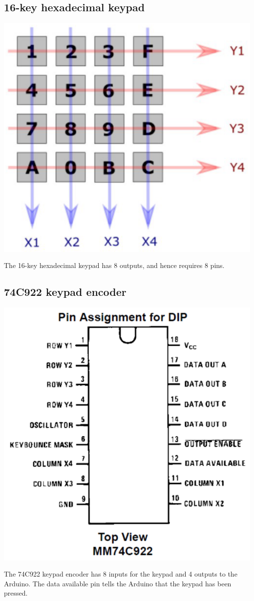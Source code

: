 \documentclass[11pt]{article}
\begin{document}
\subsection{16-key hexadecimal keypad}
\label{sec:orgb7012b9}
\begin{center}
\includegraphics[width=.9\linewidth]{./images/16-key-hexadecimal-keypad.png}
\end{center}
The 16-key hexadecimal keypad has 8 outputs, and hence requires 8 pins.

\subsection{74C922 keypad encoder}
\label{sec:org03f8307}
\begin{center}
\includegraphics[width=.9\linewidth]{./images/74c922-keypad-encoder.png}
\end{center}
The 74C922 keypad encoder has 8 inputs for the keypad and 4 outputs to the Arduino. The data available pin tells the Arduino that the keypad has been pressed.
\end{document}
